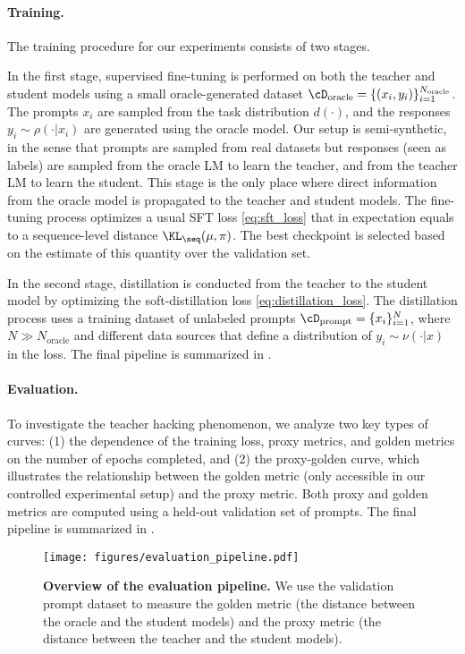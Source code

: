 \paragraph{Training.} The training procedure for our experiments consists of two stages. 


In the first stage, supervised fine-tuning is performed on both the teacher and student models using a small oracle-generated dataset $\cD_{\mathrm{oracle}} = \{(x_i, y_i)\}_{i=1}^{N_{\mathrm{oracle}}}$. The prompts $x_i$ are sampled from the task distribution $d(\cdot)$, and the responses $y_i \sim \rho(\cdot | x_i)$ are generated using the oracle model. 
Our setup is semi-synthetic, in the sense that prompts are sampled from real datasets but responses (seen as labels) are sampled from the oracle LM to learn the teacher, and from the teacher LM to learn the student.
This stage is the only place where direct information from the oracle model is propagated to the teacher and student models. The fine-tuning process optimizes a usual SFT loss \eqref{eq:sft_loss} that in expectation equals to a sequence-level distance $\KL_{\seq}(\mu, \pi)$. The best checkpoint is selected based on the estimate of this quantity over the validation set.

In the second stage, distillation is conducted from the teacher to the student model by optimizing the soft-distillation loss \eqref{eq:distillation_loss}. The distillation process uses a training dataset of unlabeled prompts $\cD_{\mathrm{prompt}} = \{x_i\}_{i=1}^N$, where $N \gg N_{\mathrm{oracle}}$ and different data sources that define a distribution of $y_i \sim \nu(\cdot | x)$ in the loss. The final pipeline is summarized in .

\paragraph{Evaluation.}
To investigate the teacher hacking phenomenon, we analyze two key types of curves: (1) the dependence of the training loss, proxy metrics, and golden metrics on the number of epochs completed, and (2) the proxy-golden curve, which illustrates the relationship between the golden metric (only accessible in our controlled experimental setup) and the proxy metric. Both proxy and golden metrics are computed using a held-out validation set of prompts. The final pipeline is summarized in .
\begin{figure}
    \centering
    \texttt{[image: figures/evaluation\_pipeline.pdf]}
    \caption{\textbf{Overview of the evaluation pipeline.} We use the validation prompt dataset to measure the golden metric (the distance between the oracle and the student models) and the proxy metric (the distance between the teacher and the student models).}
    \label{fig:evaluation_pipeline}
\end{figure}

